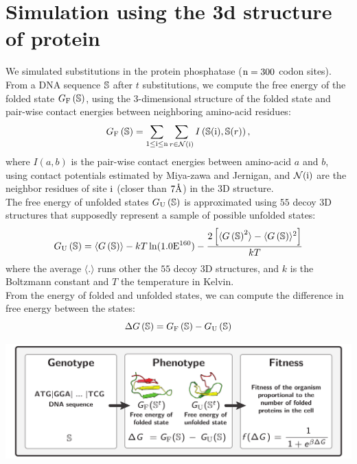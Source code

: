 \documentclass{article}
\begin{document}
\section{Simulation using the 3d structure of protein}
We simulated substitutions in the protein phosphatase ($\text{n}=300$ codon sites).
From a DNA sequence $\mathbb{S}$ after $t$ substitutions, we compute the free energy of the folded state $G_{\mathrm{F}}\left(\mathbb{S}\right)$, using the $3$-dimensional structure of the folded state and pair-wise contact energies between neighboring amino-acid residues:
\begin{equation}
G_{\mathrm{F}}\left(\mathbb{S}\right) = \sum_{1 \leq \text{i} \leq \text{n}} \sum_{r \in \mathcal{N}(\text{i})} I \left(\mathbb{S}(\text{i}), \mathbb{S}(r) \right),
\end{equation}
where $I(a,b)$ is the pair-wise contact energies between amino-acid $a$ and $b$, using contact potentials estimated by Miya-zawa and Jernigan, and $\mathcal{N}(\text{i})$ are the neighbor residues of site $\text{i}$ (closer than $7\text{\normalfont\AA}$) in the $3$D structure.\\
The free energy of unfolded states $G_{\mathrm{U}}\left(\mathbb{S}\right)$ is approximated using $55$ decoy $3$D structures that supposedly represent a sample of possible unfolded states:
\begin{equation}
G_{\mathrm{U}}\left(\mathbb{S}\right) = \langle G\left(\mathbb{S}\right) \rangle - kT \ln (1.0\mathrm{E}^{160}) - \frac{2 \left[ \langle G\left(\mathbb{S}\right)^2 \rangle - \langle G\left(\mathbb{S}\right) \rangle^2\right] }{kT}
\end{equation}
where the average $\langle . \rangle$ runs other the $55$ decoy $3$D structures, and $k$ is the Boltzmann constant and $T$ the temperature in Kelvin.\\
From the energy of folded and unfolded states, we can compute the difference in free energy between the states:
\begin{equation}
\Delta G\left(\mathbb{S}\right) = G_{\mathrm{F}}\left(\mathbb{S}\right) - G_{\mathrm{U}}\left(\mathbb{S}\right)
\end{equation}
\begin{center}
 \includegraphics[width=165mm] {artworks/ModelSimuFold.pdf}
\end{center}
\end{document}
